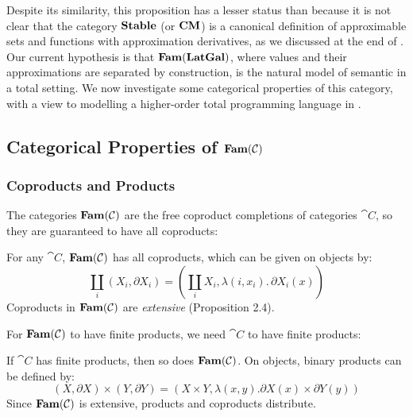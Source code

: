 Despite its similarity, this proposition has a lesser status than
 because it is not clear that the category
$\mathbf{Stable}$ (or $\mathbf{CM}$) is a canonical definition of approximable sets
and functions with approximation derivatives, as we discussed at the
end of .
Our current hypothesis is that $\mathbf{Fam}(\mathbf{LatGal})$, where values and their
approximations are separated by construction, is the natural model of
semantic \GPS in a total setting. We now investigate some categorical
properties of this category, with a view to modelling a higher-order
total programming language in .

\subsection{Categorical Properties of $\mathbf{Fam}(\mathcal{C})$}

\subsubsection{Coproducts and Products}

The categories $\mathbf{Fam}(\mathcal{C})$ are the free coproduct completions of
categories $\cat{C}$, so they are guaranteed to have all coproducts:

\begin{proposition}
  For any $\cat{C}$, $\mathbf{Fam}(\mathcal{C})$ has all coproducts, which can be
  given on objects by:
  \begin{displaymath}
    \coprod_i (X_i, \partial X_i) = (\coprod_i X_i, \lambda (i, x_i).\, \partial X_i(x))
  \end{displaymath}
  Coproducts in $\mathbf{Fam}(\mathcal{C})$ are \emph{extensive}
  \cite{carboni-lack-walters93} (Proposition 2.4).
\end{proposition}

For $\mathbf{Fam}(\mathcal{C})$ to have finite products, we need $\cat{C}$ to have
finite products:

\begin{proposition}
  If $\cat{C}$ has finite products, then so does $\mathbf{Fam}(\mathcal{C})$. On
  objects, binary products can be defined by:
  \begin{displaymath}
    (X, \partial X) \times (Y, \partial Y) = (X \times Y, \lambda (x, y). \partial X(x) \times \partial Y(y))
  \end{displaymath}
  Since $\mathbf{Fam}(\mathcal{C})$ is extensive, products and coproducts
  distribute.
\end{proposition}

